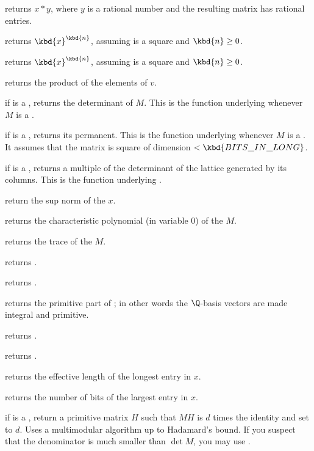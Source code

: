  returns $x*y$, where $y$ is a rational number
and the resulting matrix has rational entries.

 returns $\kbd{x}^\kbd{n}$, assuming 
is a square  and $\kbd{n}\geq 0$.

 returns $\kbd{x}^\kbd{n}$, assuming 
is a square  and $\kbd{n}\geq 0$.

 returns the product of the elements of $v$.

 if  is a , returns the determinant of
$M$. This is the function underlying  whenever $M$ is a .

 if  is a , returns its
permanent. This is the function underlying  whenever $M$
is a . It assumes that the matrix is square of dimension $<
\kbd{BITS\_IN\_LONG}$.

 if  is a , returns a multiple of
the determinant of the lattice generated by its columns. This is the function
underlying .

 return the sup norm of the  $x$.

 returns the characteristic polynomial (in
variable $0$) of the  $M$.

 returns the trace of the  $M$.

 returns .

 returns .

 returns the primitive part of ; in
other words the $\Q$-basis vectors are made integral and primitive.

 returns .

 returns .

 returns the effective length of the longest
entry in $x$.

 returns the number of bits of the largest
entry in $x$.

 if  is a , return
a primitive matrix $H$ such that $M H$ is $d$ times the identity
and set  to $d$. Uses a multimodular algorithm up to Hadamard's bound.
If you suspect that the denominator is much smaller than $\det M$, you may
use .

